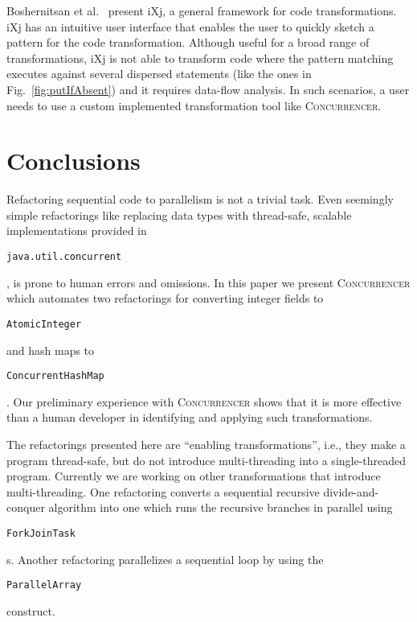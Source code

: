 \documentclass[10pt,preprint]{sigplanconf}
\newcommand\tool{{\smaller\textsc{Concurrencer}}\xspace}
\newcommand{\code}[1]{\begin{small}\texttt{#1}\end{small}}
\begin{document}
Boshernitsan et al.~\cite{Boshernitsan'07:FrameworkForTransformations} present
iXj, a general framework for code transformations. iXj has an intuitive user
interface that enables the user to quickly sketch a pattern for the code
transformation. Although useful for a broad range of transformations, iXj is not
able to transform code where the pattern matching executes against several
dispersed statements (like the ones in Fig.~\ref{fig:putIfAbsent}) and it
requires data-flow analysis. In such scenarios, a user needs to use a custom
implemented transformation tool like \tool.

\section{Conclusions}
Refactoring sequential code to parallelism is not a trivial task. Even
seemingly simple refactorings like replacing data types with thread-safe,
scalable implementations provided in \code{java.util.concurrent}, is prone to
human errors and omissions. In this paper we present \tool which automates two
refactorings for converting integer fields to \code{AtomicInteger} and hash maps to
\code{ConcurrentHashMap}. Our preliminary experience with \tool shows that it
is more effective than a human developer in identifying and applying such
transformations.

The refactorings presented here are ``enabling transformations'', i.e., they
make a program thread-safe, but do not introduce multi-threading into a
single-threaded program. Currently we are working on other transformations that
introduce multi-threading. One refactoring converts a sequential
recursive divide-and-conquer algorithm into one which runs the recursive
branches in parallel using \code{ForkJoinTask}s. Another refactoring
parallelizes a sequential loop by using the \code{ParallelArray} construct.


% 

% 
% 
% 
\end{document}
